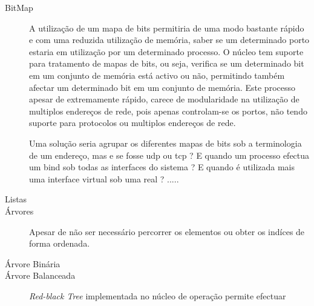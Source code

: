 \begin{description}

\item[BitMap]

A utilização de um mapa de bits permitiria de uma modo bastante rápido e com uma reduzida utilização de memória, saber se um determinado porto estaria em utilização por um determinado processo.
O núcleo tem suporte para tratamento de mapas de bits, ou seja, verifica se um determinado bit em um conjunto de memória está activo ou não, permitindo também afectar um determinado bit em um conjunto de memória.
Este processo apesar de extremamente rápido, carece de modularidade na utilização de multiplos endereços de rede, pois apenas controlam-se os portos, não tendo suporte para protocolos ou multiplos endereços de rede.
 
Uma solução seria agrupar os diferentes mapas de bits sob a terminologia de um endereço, mas e se fosse udp ou tcp ?
E quando um processo efectua um bind sob todas as interfaces do sistema ? 
E quando é utilizada mais uma interface virtual sob uma real ? .....


\item[Listas]






\item[Árvores]
Apesar de não ser necessário percorrer os elementos ou obter os indíces de forma ordenada. 


\item[Árvore Binária]

\item[Árvore Balanceada]
\textit{Red-black Tree} implementada no núcleo de operação permite efectuar


\end{description}
